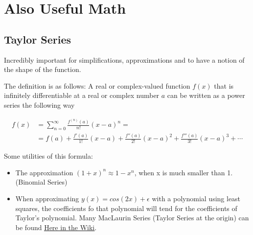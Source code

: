 

\section{Also Useful Math}

\subsection{Taylor Series}
Incredibly important for simplifications, approximations and to have a notion of the shape of the function.

The definition is as follows:
A real or complex-valued function $f(x)$ that is infinitely differentiable at a real or complex number $a$ can be written as a power series the following way

\begin{align*}
    f(x) &= \sum_{n = 0}^{\infty} \frac{f^{(n)}(a)}{n!} (x-a)^n = \\
    &= f(a)+{\frac {f'(a)}{1!}}(x-a)+{\frac {f''(a)}{2!}}(x-a)^{2}+{\frac {f'''(a)}{3!}}(x-a)^{3}+\cdots
\end{align*}

Some utilities of this formula:
\begin{itemize}
    \item The approximation $(1+x)^n \approx 1-x^n$, when x is much smaller than 1. (Binomial Series)
    \item When approximating $y(x) = cos(2x) + \epsilon$ with a polynomial using least squares, the coefficients fo that polynomial will tend for the coefficients of Taylor's polynomial. Many MacLaurin Series (Taylor Series at the origin) can be found \href{https://en.wikipedia.org/wiki/Taylor_series#List_of_Maclaurin_series_of_some_common_functions}{\ul{Here in the Wiki}}.
\end{itemize}

